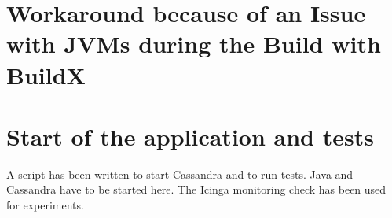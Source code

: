 \section{Workaround because of an Issue with JVMs during the Build with BuildX}

\section{Start of the application and tests}

A script has been written to start Cassandra and to run tests. Java and Cassandra have to be started here. The Icinga monitoring check has been used for experiments.
